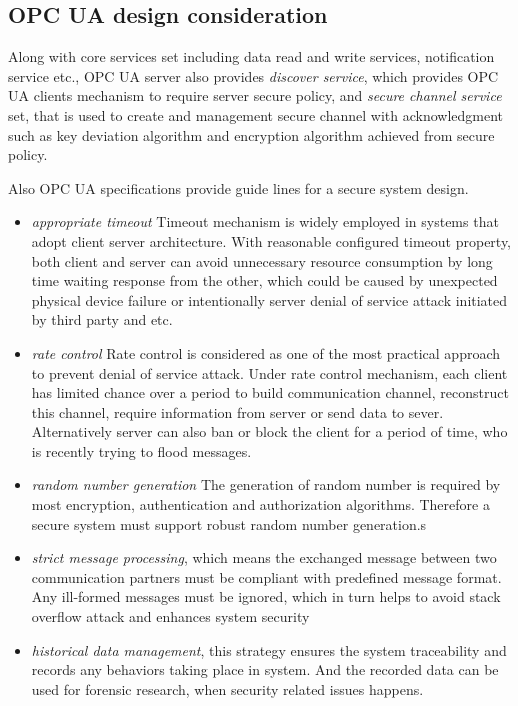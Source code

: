 \subsection{OPC UA design consideration}
Along with core services set including data read and write services, notification service etc., OPC UA server also provides \emph{discover service}\cite{O4}, which provides OPC UA clients mechanism to require server secure policy, and \emph{secure channel service} set\cite{O4}, that is used to create and management secure channel with acknowledgment such as key deviation algorithm and encryption algorithm achieved from secure policy. 

Also OPC UA specifications provide guide lines for a secure system design\cite{O4}.
\begin{itemize}
\item \emph{appropriate timeout} Timeout mechanism is widely employed in systems that adopt client server architecture. With reasonable configured timeout property, both client and server can avoid unnecessary resource consumption by long time waiting response from the other, which could be caused by unexpected physical device failure or intentionally server denial of service attack initiated by third party and etc. 
\item \emph{rate control} Rate control is considered as one of the most practical approach to prevent denial of service attack. Under rate control mechanism, each client has limited chance over a period to build communication channel, reconstruct this channel, require information from server or send data to sever. Alternatively server can also ban or block the client for a period of time, who is recently trying to flood messages. 
\item \emph{random number generation} The generation of random number is required by most encryption, authentication and authorization algorithms. Therefore a secure system must support robust random number generation.s
\item \emph{strict message processing}, which means the exchanged message between two communication partners must be compliant with predefined message format. Any ill-formed messages must be ignored, which in turn helps to avoid stack overflow attack and enhances system security
\item \emph{historical data management}, this strategy ensures the system traceability and records any behaviors taking place in system. And the recorded data can be used for forensic research, when security related issues happens.
\end{itemize}
